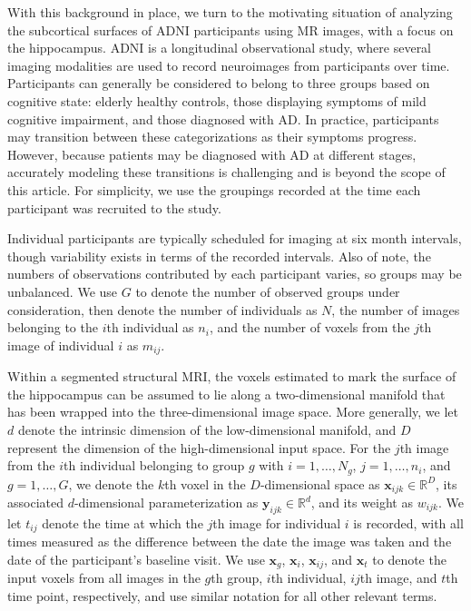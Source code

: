 \documentclass[11pt,reqno]{article}
\theoremstyle{definition}
\begin{document}
With this background in place, we turn to the motivating situation of analyzing the subcortical surfaces of ADNI participants using MR images, with a focus on the hippocampus. ADNI is a longitudinal observational study, where several imaging modalities are used to record neuroimages from participants over time. Participants can generally be considered to belong to three groups based on cognitive state: elderly healthy controls, those displaying symptoms of mild cognitive impairment, and those diagnosed with AD. In practice, participants may transition between these categorizations as their symptoms progress. However, because patients may be diagnosed with AD at different stages, accurately modeling these transitions is challenging and is beyond the scope of this article. For simplicity, we use the groupings recorded at the time each participant was recruited to the study. 

Individual participants are typically scheduled for imaging at six month intervals, though variability exists in terms of the recorded intervals. Also of note, the numbers of observations contributed by each participant varies, so groups may be unbalanced. We use $G$ to denote the number of observed groups under consideration, then denote the number of individuals as $N$, the number of images belonging to the $i$th individual as $n_i$, and the number of voxels from the $j$th image of individual $i$ as $m_{ij}$. 

Within a segmented structural MRI, the voxels estimated to mark the surface of the hippocampus can be assumed to lie along a two-dimensional manifold that has been wrapped into the three-dimensional image space. More generally, we let $d$ denote the intrinsic dimension of the low-dimensional manifold, and $D$ represent the dimension of the high-dimensional input space. For the $j$th image from the $i$th individual belonging to group $g$ with $i = 1, \dots, N_g$, $j = 1, \dots, n_i$, and $g = 1, \dots, G$, we denote the $k$th voxel in the $D$-dimensional space as $\mathbf{x}_{ijk} \in \mathbb{R}^{D}$, its associated $d$-dimensional parameterization as $\mathbf{y}_{ijk} \in \mathbb{R}^{d}$, and its weight as $w_{ijk}$. We let $t_{ij}$ denote the time at which the $j$th image for individual $i$ is recorded, with all times measured as the difference between the date the image was taken and the date of the participant's baseline visit. We use $\mathbf{x}_g$, $\mathbf{x}_i$, $\mathbf{x}_{ij}$, and $\mathbf{x}_t$ to denote the input voxels from all images in the $g$th group, $i$th individual, $ij$th image, and $t$th time point, respectively, and use similar notation for all other relevant terms.
\end{document}

